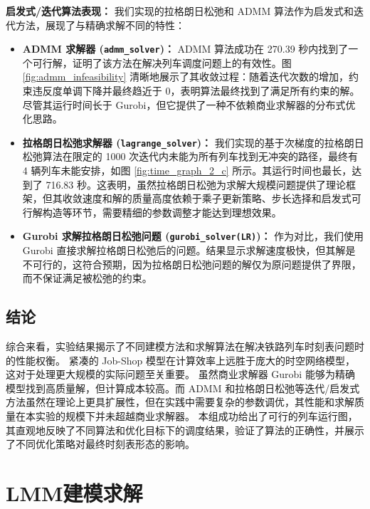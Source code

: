 \documentclass{article}
\begin{document}
\textbf{启发式/迭代算法表现：}
我们实现的拉格朗日松弛和 ADMM 算法作为启发式和迭代方法，展现了与精确求解不同的特性：
\begin{itemize}
    \item \textbf{ADMM 求解器 (\texttt{admm\_solver})：} ADMM 算法成功在
        270.39 秒内找到了一个可行解，证明了该方法在解决列车调度问题上的有效性。图
        \ref{fig:admm_infeasibility}
        清晰地展示了其收敛过程：随着迭代次数的增加，约束违反度单调下降并最终趋近于
        0，表明算法最终找到了满足所有约束的解。尽管其运行时间长于 Gurobi，但它提供了一种不依赖商业求解器的分布式优化思路。
    \item \textbf{拉格朗日松弛求解器 (\texttt{lagrange\_solver})：}
        我们实现的基于次梯度的拉格朗日松弛算法在限定的 1000 次迭代内未能为所有列车找到无冲突的路径，最终有 4
        辆列车未能安排，如图 \ref{fig:time_graph_2_c} 所示。其运行时间也最长，达到了 716.83
        秒。这表明，虽然拉格朗日松弛为求解大规模问题提供了理论框架，但其收敛速度和解的质量高度依赖于乘子更新策略、步长选择和启发式可行解构造等环节，需要精细的参数调整才能达到理想效果。
    \item \textbf{Gurobi 求解拉格朗日松弛问题 (\texttt{gurobi\_solver(LR)})：}
        作为对比，我们使用 Gurobi
        直接求解拉格朗日松弛后的问题。结果显示求解速度极快，但其解是不可行的，这符合预期，因为拉格朗日松弛问题的解仅为原问题提供了界限，而不保证满足被松弛的约束。
\end{itemize}

\subsection{结论}
综合来看，实验结果揭示了不同建模方法和求解算法在解决铁路列车时刻表问题时的性能权衡。 紧凑的 Job-Shop
模型在计算效率上远胜于庞大的时空网络模型，这对于处理更大规模的实际问题至关重要。
虽然商业求解器 Gurobi 能够为精确模型找到高质量解，但计算成本较高。而 ADMM
和拉格朗日松弛等迭代/启发式方法虽然在理论上更具扩展性，但在实践中需要复杂的参数调优，其性能和求解质量在本实验的规模下并未超越商业求解器。
本组成功给出了可行的列车运行图，其直观地反映了不同算法和优化目标下的调度结果，验证了算法的正确性，并展示了不同优化策略对最终时刻表形态的影响。

\section{LMM建模求解}
\end{document}

